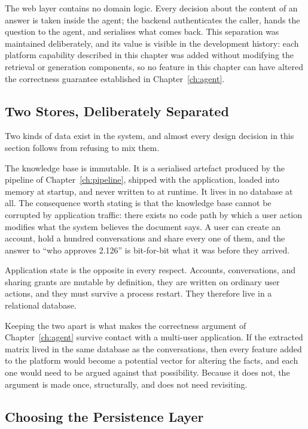 The web layer contains no domain logic. Every decision about the content of an answer is
taken inside the agent; the backend authenticates the caller, hands the question to the
agent, and serialises what comes back. This separation was maintained deliberately, and
its value is visible in the development history: each platform capability described in
this chapter was added without modifying the retrieval or generation components, so no
feature in this chapter can have altered the correctness guarantee established in
Chapter~\ref{ch:agent}.

\subsection{Two Stores, Deliberately Separated}

Two kinds of data exist in the system, and almost every design decision in this section
follows from refusing to mix them.

The knowledge base is immutable. It is a serialised artefact produced by the pipeline of
Chapter~\ref{ch:pipeline}, shipped with the application, loaded into memory at startup, and
never written to at runtime. It lives in no database at all. The consequence worth stating
is that the knowledge base cannot be corrupted by application traffic: there exists no code
path by which a user action modifies what the system believes the document says. A user can
create an account, hold a hundred conversations and share every one of them, and the answer
to ``who approves 2.126'' is bit-for-bit what it was before they arrived.

Application state is the opposite in every respect. Accounts, conversations, and sharing
grants are mutable by definition, they are written on ordinary user actions, and they must
survive a process restart. They therefore live in a relational database.

Keeping the two apart is what makes the correctness argument of Chapter~\ref{ch:agent}
survive contact with a multi-user application. If the extracted matrix lived in the same
database as the conversations, then every feature added to the platform would become a
potential vector for altering the facts, and each one would need to be argued against that
possibility. Because it does not, the argument is made once, structurally, and does not need
revisiting.

\subsection{Choosing the Persistence Layer}

